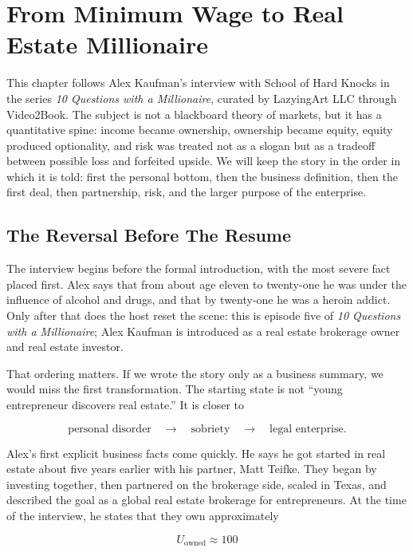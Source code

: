 \chapter{From Minimum Wage to Real Estate Millionaire}

This chapter follows Alex Kaufman's interview with School of Hard Knocks in the series \emph{10 Questions with a Millionaire}, curated by LazyingArt LLC through Video2Book. The subject is not a blackboard theory of markets, but it has a quantitative spine: income became ownership, ownership became equity, equity produced optionality, and risk was treated not as a slogan but as a tradeoff between possible loss and forfeited upside. We will keep the story in the order in which it is told: first the personal bottom, then the business definition, then the first deal, then partnership, risk, and the larger purpose of the enterprise.

\section{The Reversal Before The Resume}

The interview begins before the formal introduction, with the most severe fact placed first. Alex says that from about age eleven to twenty-one he was under the influence of alcohol and drugs, and that by twenty-one he was a heroin addict. Only after that does the host reset the scene: this is episode five of \emph{10 Questions with a Millionaire}; Alex Kaufman is introduced as a real estate brokerage owner and real estate investor.

That ordering matters. If we wrote the story only as a business summary, we would miss the first transformation. The starting state is not ``young entrepreneur discovers real estate.'' It is closer to

\begin{equation}
\text{personal disorder}
\quad \longrightarrow \quad
\text{sobriety}
\quad \longrightarrow \quad
\text{legal enterprise}.
\end{equation}

Alex's first explicit business facts come quickly. He says he got started in real estate about five years earlier with his partner, Matt Teifke. They began by investing together, then partnered on the brokerage side, scaled in Texas, and described the goal as a global real estate brokerage for entrepreneurs. At the time of the interview, he states that they own approximately

\begin{equation}
U_{\text{owned}} \approx 100
\end{equation}

